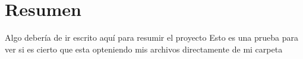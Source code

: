 \chapter*{Resumen}
\begin{center}
  
  Algo debería de ir escrito aquí para resumir el proyecto
  Esto es una prueba para ver si es cierto que esta opteniendo mis archivos directamente de mi carpeta
\end{center}









